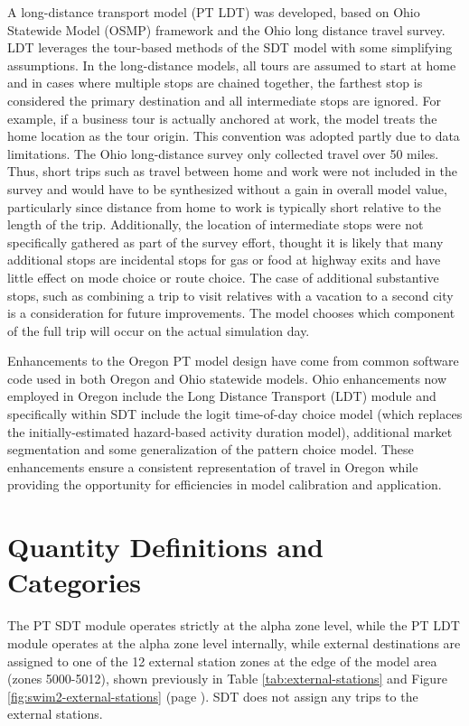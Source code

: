 A long-distance transport model (PT LDT) was developed, based on Ohio Statewide Model (OSMP) framework and the Ohio long distance travel survey. LDT leverages the tour-based methods of the SDT model with some simplifying assumptions. In the long-distance models, all tours are assumed to start at home and in cases where multiple stops are chained together, the farthest stop is considered the primary destination and all intermediate stops are ignored. For example, if a business tour is actually anchored at work, the model treats the home location as the tour origin. This convention was adopted partly due to data limitations. The Ohio long-distance survey only collected travel over 50 miles. Thus, short trips such as travel between home and work were not included in the survey and would have to be synthesized without a gain in overall model value, particularly since distance from home to work is typically short relative to the length of the trip. Additionally, the location of intermediate stops were not specifically gathered as part of the survey effort, thought it is likely that many additional stops are incidental stops for gas or food at highway exits and have little effect on mode choice or route choice. The case of additional substantive stops, such as combining a trip to visit relatives with a vacation to a second city is a consideration for future improvements. The model chooses which component of the full trip will occur on the actual simulation day.

Enhancements to the Oregon PT model design have come from common software code used in both Oregon and Ohio statewide models. Ohio enhancements now employed in Oregon include the Long Distance Transport (LDT) module and specifically within SDT include the logit time-of-day choice model (which replaces the initially-estimated hazard-based activity duration model), additional market segmentation and some generalization of the pattern choice model. These enhancements ensure a consistent representation of travel in Oregon while providing the opportunity for efficiencies in model calibration and application.

\section{Quantity Definitions and Categories}
The PT SDT module operates strictly at the alpha zone level, while the PT LDT module operates at the alpha zone level internally, while external destinations are assigned to one of the 12 external station zones at the edge of the model area (zones 5000-5012), shown previously in Table \ref{tab:external-stations} and Figure \ref{fig:swim2-external-stations} (page \pageref{fig:swim2-external-stations}). SDT does not assign any trips to the external stations.

